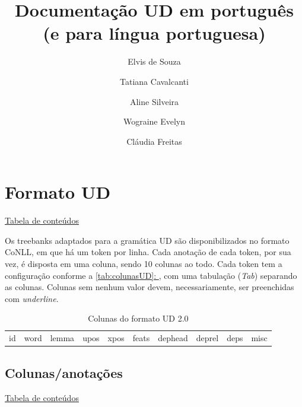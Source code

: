\documentclass[output=paper,colorlinks,citecolor=brown]{langscibook}
\author{Elvis de Souza\affiliation{PUC-Rio, Brasil}\and Tatiana Cavalcanti\and Aline Silveira\and Wograine Evelyn\and Cláudia Freitas}
\title{Documentação UD em português\\
(e para língua portuguesa)}
\newcommand*{\fullref}[1]{\hyperref[{#1}]{\autoref*{#1}: \nameref*{#1}}} %
\begin{document}
\maketitle


\tableofcontents

\chapter{Formato UD}\label{sec:formatoud}

\hyperlink{toc}{Tabela de conteúdos\\}

Os treebanks adaptados para a gramática UD são disponibilizados no formato CoNLL, em que há um token por linha. Cada anotação de cada token, por sua vez, é disposta em uma coluna, sendo 10 colunas ao todo. Cada token tem a configuração conforme a \fullref{tab:colunasUD}, com uma tabulação (\textit{Tab}) separando as colunas. Colunas sem nenhum valor devem, necessariamente, ser preenchidas com \textit{underline}.

\begin{table}
    \centering
    \begin{tabular}{c c c c c c c c c c}
        id & word & lemma & upos & xpos & feats & dephead & deprel & deps & misc\\
    \end{tabular}
    \caption{Colunas do formato UD 2.0}
    \label{tab:colunasUD}
\end{table}

\section{Colunas/anotações}\label{sec:colunas}

\hyperlink{toc}{Tabela de conteúdos\\}
\end{document}
